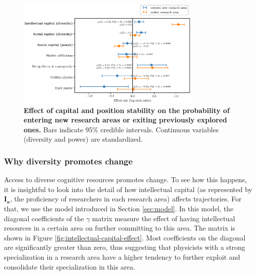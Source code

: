 \documentclass{article}
\begin{document}

\begin{figure}[h]
    \centering
    \includegraphics[width=0.8\textwidth]{plots/exited_score_effects_entropy_magnitude.eps}
    \caption{\textbf{Effect of capital and position stability on the probability of entering new research areas or exiting previously explored ones.} Bars indicate 95\% credible intervals. Continuous variables (diversity and power) are standardized.}
    \label{fig:diversification_score_effect}
\end{figure}


\subsubsection{Why diversity promotes change}

Access to diverse cognitive resources promotes change. To see how this happens, it is insightful to look into the detail of how intellectual capital (as represented by $\bm{I_a}$, the proficiency of researchers in each research area) affects trajectories. For that, we use the model introduced in Section \ref{sec:model}. In this model, the diagonal coefficients of the $\gamma$ matrix measure the effect of having intellectual resources in a certain area on further committing to this area. The matrix is shown in Figure \ref{fig:intellectual-capital-effect}. Most coefficients on the diagonal are significantly greater than zero, thus suggesting that physicists with a strong specialization in a research area have a higher tendency to further exploit and consolidate their specialization in this area.
\end{document}
